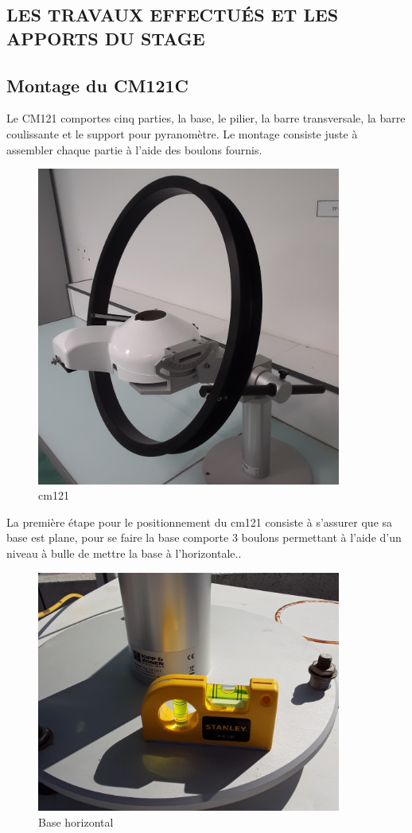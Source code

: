 \documentclass[12pt,a4paper]{article}
\begin{document}
\begin{flushleft}
\section{LES TRAVAUX EFFECTUÉS ET LES APPORTS DU STAGE}



\subsection{Montage du CM121C}

Le CM121 comportes cinq parties, la base, le pilier, la barre transversale, la barre coulissante et le support pour pyranomètre. Le montage consiste juste à assembler chaque partie à l'aide des boulons fournis.

\begin{figure}[H]
\centering
\includegraphics[width=10cm]{image/montage/1.jpg} 
\caption{cm121}
\end{figure}


La première étape pour le positionnement du cm121 consiste à s'assurer que sa base est plane, pour se faire la base comporte 3 boulons permettant à l'aide d'un niveau à bulle de mettre la base à l'horizontale.. 

\begin{figure}[H]
\centering
\includegraphics[width=10cm]{image/montage/2.jpg} 
\caption{Base horizontal}
\end{figure}



\end{flushleft}
\end{document}
